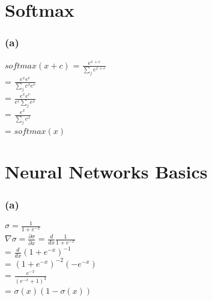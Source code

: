 \documentclass{article}
\title{CS224N Assignment #1}
\author{Adriano Carmezim }
\date{September 2017}
\begin{document}
\maketitle

\section{Softmax}
\subsubsection*{(a)}
    \begin{center}
        $softmax(x + c)$
        \large
        {
            = $\frac{e^{x + c}}{\sum_j e^{x + c}}$ \\[5pt]
            = $\frac{e^{x}e^{c}}{\sum_j e^{x} e^{c}}$ \\[5pt]
            = $\frac{e^{x}e^{c}}{e^{c}\sum_j e^{x}}$ \\[5pt]
            = $\frac{e^{x}}{\sum_j e^{x}}$ \\[5pt]
            = $softmax(x)$
        }
    \end{center}

\section{Neural Networks Basics}
\subsubsection*{(a)}
\begin{center}
    \large
    {
        $\sigma = \frac{1}{1 + e^{-x}}$ \\[15pt]
        $\nabla \sigma = \frac {\partial \sigma}{\partial x}$
        = $\frac{d}{dx} \frac{1}{1 + e^{-x}}$\\[6pt]
        = $\frac{d}{dx} (1 + e^{-x})^{-1}$\\[6pt]
        = $(1 + e^{-x})^{-2}(-e^{-x})$ \\[6pt]
        = $\frac{e^{-x}}{(e^{-x} + 1)^2}$ \\[6pt]
        = $\sigma(x)(1 - \sigma(x))$
    }
\end{center}

\newpage
\end{document}
